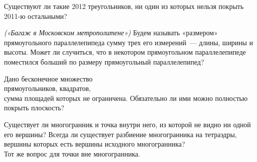 \begin{problems}
\item
Существуют ли такие 2012 треугольников, ни один из которых нельзя покрыть
2011-ю остальными?


\item\emph{(«Багаж в Московском метрополитене»)}
Будем называть «размером» прямоугольного параллелепипеда сумму трех его
измерений~— длины, ширины и высоты.
Может ли случиться, что в некотором прямоугольном параллелепипеде поместился
больший по размеру прямоугольный параллелепипед?

\item
Дано бесконечное множество
\\
\subproblem прямоугольников,
\quad
\subproblem квадратов,
\\
сумма площадей которых не ограничена.
Обязательно ли ими можно полностью покрыть плоскость?

\item
\subproblem
Существует ли многогранник и точка внутри него, из которой не видно ни одной
его вершины?
Всегда ли существует разбиение многогранника на тетраэдры, вершины которых есть
вершины исходного многогранника?
\\
\subproblem
Тот же вопрос для точки вне многогранника.

\end{problems}

